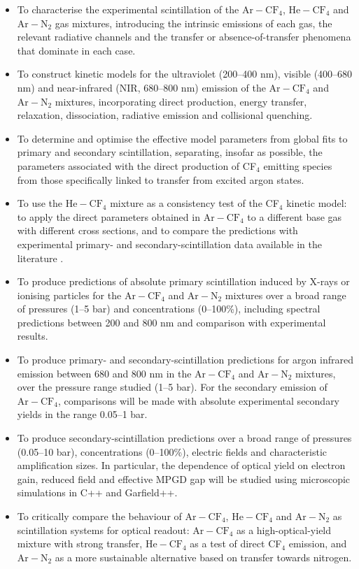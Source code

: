 \documentclass[12pt,a4paper]{article}
\newcommand{\N}{\mathrm{N}}
\newcommand{\He}{\mathrm{He}}
\newcommand{\Ar}{\mathrm{Ar}}
\newcommand{\CF}{\mathrm{CF}}
\begin{document}
\begin{itemize}
    \item To characterise the experimental scintillation of the $\Ar-\CF_4$, $\He-\CF_4$ and $\Ar-\N_2$ gas mixtures, introducing the intrinsic emissions of each gas, the relevant radiative channels and the transfer or absence-of-transfer phenomena that dominate in each case.

    \item To construct kinetic models for the ultraviolet (200--400 nm), visible (400--680 nm) and near-infrared (NIR, 680--800 nm) emission of the $\Ar-\CF_4$ and $\Ar-\N_2$ mixtures, incorporating direct production, energy transfer, relaxation, dissociation, radiative emission and collisional quenching.

    \item To determine and optimise the effective model parameters from global fits to primary and secondary scintillation, separating, insofar as possible, the parameters associated with the direct production of CF$_4$ emitting species from those specifically linked to transfer from excited argon states.

    \item To use the $\He-\CF_4$ mixture as a consistency test of the CF$_4$ kinetic model: to apply the direct parameters obtained in $\Ar-\CF_4$ to a different base gas with different cross sections, and to compare the predictions with experimental primary- and secondary-scintillation data available in the literature \cite{fraga2003the,FlorianPrimarySecundary}.

    \item To produce predictions of absolute primary scintillation induced by X-rays or ionising particles for the $\Ar-\CF_4$ and $\Ar-\N_2$ mixtures over a broad range of pressures (1--5 bar) and concentrations (0--100\%), including spectral predictions between 200 and 800 nm and comparison with experimental results.

    \item To produce primary- and secondary-scintillation predictions for argon infrared emission between 680 and 800 nm in the $\Ar-\CF_4$ and $\Ar-\N_2$ mixtures, over the pressure range studied (1--5 bar). For the secondary emission of $\Ar-\CF_4$, comparisons will be made with absolute experimental secondary yields in the range 0.05--1 bar.

    \item To produce secondary-scintillation predictions over a broad range of pressures (0.05--10 bar), concentrations (0--100\%), electric fields and characteristic amplification sizes. In particular, the dependence of optical yield on electron gain, reduced field and effective MPGD gap will be studied using microscopic simulations in C++ and Garfield++.

    \item To critically compare the behaviour of $\Ar-\CF_4$, $\He-\CF_4$ and $\Ar-\N_2$ as scintillation systems for optical readout: $\Ar-\CF_4$ as a high-optical-yield mixture with strong transfer, $\He-\CF_4$ as a test of direct CF$_4$ emission, and $\Ar-\N_2$ as a more sustainable alternative based on transfer towards nitrogen.
\end{itemize}
\end{document}
